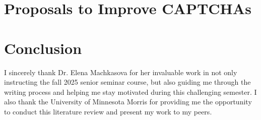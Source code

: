 \documentclass[sigplan,screen,nonacm]{acmart-tagged}
\begin{document}
\section{Proposals to Improve CAPTCHAs}

\section{Conclusion}


\begin{acks}
I sincerely thank Dr. Elena Machkasova for her invaluable work in not only instructing the fall 2025 senior seminar course, but also guiding me through the writing process and helping me stay motivated during this challenging semester. I also thank the University of Minnesota Morris for providing me the opportunity to conduct this literature review and present my work to my peers.
\end{acks}



\end{document}
